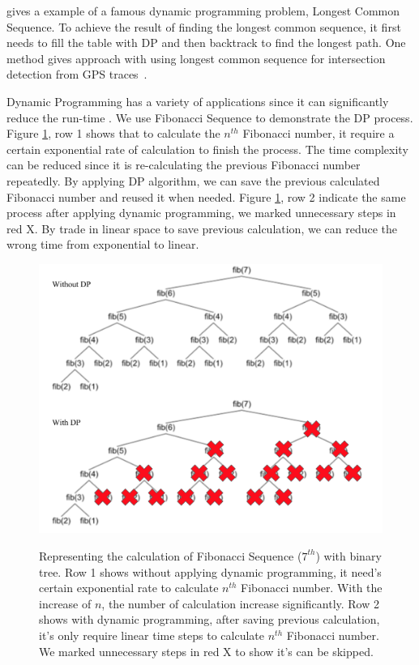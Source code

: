  gives a example of a famous dynamic programming problem, Longest Common Sequence. To achieve the result of finding the longest common sequence, it first needs to fill the table with \ac{DP} and then backtrack to find the longest path. One method gives approach with using longest common sequence for intersection detection from GPS traces~\cite{Xie2017DetectingRI}.

Dynamic Programming has a variety of applications since it can significantly reduce the run-time \cite{bertsekas1995neuro}. 
We use Fibonacci Sequence to demonstrate the \ac{DP} process\cite{horadam1961generalized}. 
Figure \ref{fig:fbs}, row 1 shows that to calculate the $n^{th}$ Fibonacci number, it require a certain exponential rate of calculation to finish the process.
The time complexity can be reduced since it is re-calculating the previous Fibonacci number repeatedly. 
By applying \ac{DP} algorithm, we can save the previous calculated Fibonacci number and reused it when needed.
Figure \ref{fig:fbs}, row 2 indicate the same process after applying dynamic programming, we marked unnecessary steps in red X. 
By trade in linear space to save previous calculation, we can reduce the wrong time from exponential to linear.

\begin{figure}[H]
    \centering
    \includegraphics[width=\textwidth]{Figures/treewithdp.png}
    \caption[Demonstration on Fibonacci Sequence]{Representing the calculation of Fibonacci Sequence ($7^{th}$) with binary tree. Row 1 shows without applying dynamic programming, it need's certain exponential rate to calculate $n^{th}$ Fibonacci number. With the increase of $n$, the number of calculation increase significantly. Row 2 shows with dynamic programming, after saving previous calculation, it's only require linear time steps to calculate $n^{th}$ Fibonacci number. We marked unnecessary steps in red X to show it's can be skipped. }
    \cite{stack_overflow}
    \label{fig:fbs}
\end{figure}

